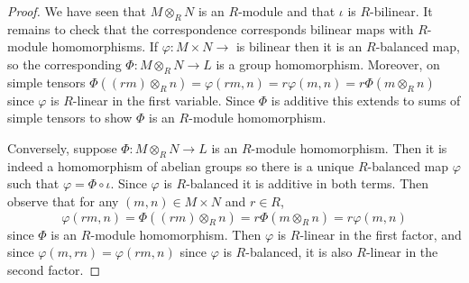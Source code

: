 \documentclass[12pt, a4paper, oneside, openright, titlepage]{book}
\begin{document}
\begin{proof}
    We have seen that $M\otimes_RN$ is an $R$-module and that $\iota$ is $R$-bilinear. It remains to check that the correspondence corresponds bilinear maps with $R$-module homomorphisms. If $\varphi:M\times N\rightarrow$ is bilinear then it is an $R$-balanced map, so the corresponding $\Phi:M\otimes_RN\rightarrow L$ is a group homomorphism. Moreover, on simple tensors $\Phi((rm)\otimes_Rn) = \varphi(rm,n) = r\varphi(m,n) = r\Phi(m\otimes_Rn)$ since $\varphi$ is $R$-linear in the first variable. Since $\Phi$ is additive this extends to sums of simple tensors to show $\Phi$ is an $R$-module homomorphism.

    Conversely, suppose $\Phi:M\otimes_RN\rightarrow L$ is an $R$-module homomorphism. Then it is indeed a homomorphism of abelian groups so there is a unique $R$-balanced map $\varphi$ such that $\varphi = \Phi\circ \iota$. Since $\varphi$ is $R$-balanced it is additive in both terms. Then observe that for any $(m,n) \in M\times N$ and $r \in R$, \begin{equation*}
        \varphi(rm,n) = \Phi((rm)\otimes_Rn) = r\Phi(m\otimes_Rn) = r\varphi(m,n)
    \end{equation*}
    since $\Phi$ is an $R$-module homomorphism. Then $\varphi$ is $R$-linear in the first factor, and since $\varphi(m,rn) = \varphi(rm,n)$ since $\varphi$ is $R$-balanced, it is also $R$-linear in the second factor.
\end{proof}
\end{document}

